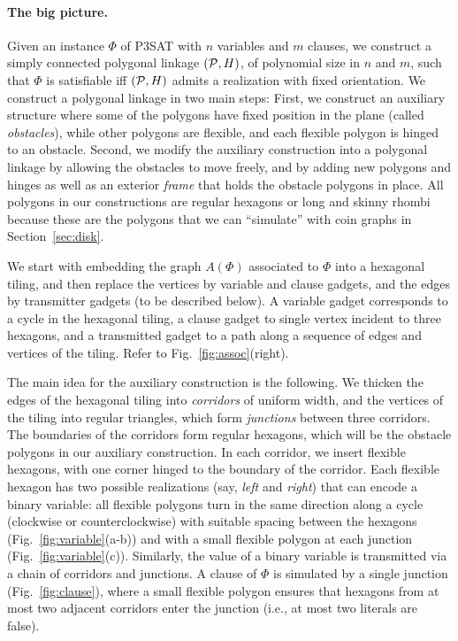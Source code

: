 \documentclass{article}
\theoremstyle{plain}%
\newcommand{\PP}{{\cal P}} %
\begin{document}
\paragraph{The big picture.}
Given an instance $\Phi$ of P3SAT with $n$ variables and $m$ clauses, we construct a simply connected polygonal linkage $(\PP,H)$, of polynomial size in $n$ and $m$, such that $\Phi$ is satisfiable iff $(\PP,H)$ admits a realization with fixed orientation. We construct a polygonal linkage  in two main steps: First, we construct an auxiliary structure where some of the polygons have fixed position in the plane (called \emph{obstacles}), while other polygons are flexible, and each flexible polygon is hinged to an obstacle. Second, we modify the auxiliary construction into a polygonal linkage by allowing the obstacles to move freely, and by adding new polygons and hinges as well as an exterior \emph{frame} that holds the obstacle polygons in place. All polygons in our constructions are regular hexagons or long and skinny rhombi because these are the polygons that we can ``simulate'' with coin graphs in Section~\ref{sec:disk}.

We start with embedding the graph $A(\Phi)$ associated to $\Phi$ into a hexagonal tiling, and then replace the vertices by variable and clause gadgets, and the edges by transmitter gadgets (to be described below). A variable gadget corresponds to a cycle in the hexagonal tiling, a clause gadget to single vertex incident to three hexagons, and a transmitted gadget to a path along a sequence of edges and vertices of the tiling. Refer to Fig.~\ref{fig:assoc}(right).

The main idea for the auxiliary construction is the following. We thicken the edges of the hexagonal tiling into \emph{corridors} of uniform width, and the vertices of the tiling into regular triangles, which form \emph{junctions} between three corridors. The boundaries of the corridors form regular hexagons, which will be the obstacle polygons in our auxiliary construction. In each corridor, we insert flexible hexagons, with one corner hinged to the boundary of the corridor. Each flexible hexagon has two possible realizations (say, \emph{left} and \emph{right}) that can encode a binary variable: all flexible polygons turn in the same direction along a cycle (clockwise or counterclockwise) with suitable spacing between the hexagons (Fig.~\ref{fig:variable}(a-b)) and with a small flexible polygon at each junction (Fig.~\ref{fig:variable}(c)). Similarly, the value of a binary variable is transmitted via a chain of corridors and junctions. A clause of $\Phi$ is simulated by a single junction (Fig.~\ref{fig:clause}), where a small flexible polygon ensures that hexagons from at most two adjacent corridors enter the junction (i.e., at most two literals are false).
\end{document}
